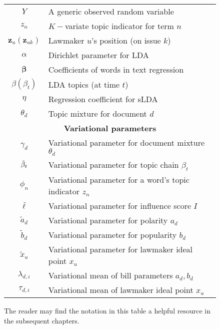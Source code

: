 \begin{figure*}
\begin{tabular}{|c|l|}
      $Y$ & A generic observed random variable \\
      $z_n$ & $K-$variate topic indicator for term $n$ \\
      $\bm z_u (\bm z_{uk})$ & Lawmaker $u$'s position (on issue $k$) \\
      $\alpha$ & Dirichlet parameter for LDA \\
      $\bm \beta$ & Coefficients of words in text regression \\
      $\beta (\beta_t)$ & LDA topics (at time $t$) \\
      $\eta$ & Regression coefficient for sLDA \\
      $\theta_d$ & Topic mixture for document $d$ \\
      \hline
      \multicolumn{2}{|c|}{\textbf{Variational parameters}} \\
      \hline
      $\gamma_d$ & Variational parameter for document mixture $\theta_d$ \\
      $\tilde{\beta}_t$ & Variational parameter for topic chain $\beta_t$ \\
      $\phi_n$ & Variational parameter for a word's topic indicator $z_n$ \\
      $\tilde{\ell}$ & Variational parameter for influence score $I$ \\
      $\tilde a_d$ & Variational parameter for polarity $a_d$ \\
      $\tilde b_d$ & Variational parameter for popularity $b_d$ \\
      $\tilde x_u$ & Variational parameter for lawmaker ideal point $x_u$ \\
      $\lambda_{d,i}$ & Variational mean of bill parameters $a_d, b_d$
      \\
      $\tau_{d,i}$ & Variational mean of lawmaker ideal point $x_u$ \\
      \hline
    \end{tabular}
\caption{The reader may find the notation in this table a helpful resource in the
 subsequent chapters.}
\end{figure*}
